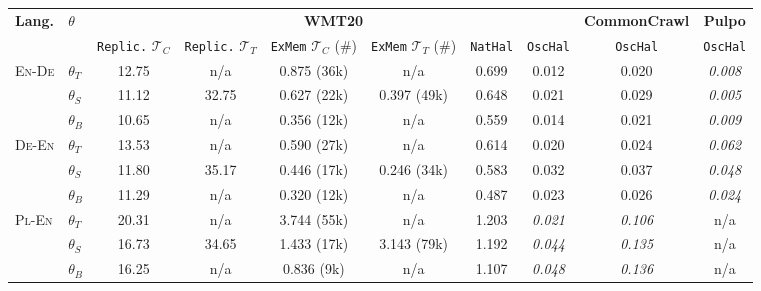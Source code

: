 \vspace{.1cm}
\noindent\begin{minipage}{\textwidth}
    \begin{center}
    {\centering\small\setlength{\tabcolsep}{4.5pt}
    \begin{tabular}{llcccccccc}
    \toprule
    \textbf{Lang.} & \textbf{$\theta$} & \multicolumn{6}{c}{\textbf{WMT20}} & \textbf{CommonCrawl} & \textbf{Pulpo} \\
    && \texttt{Replic.} $\mathcal{T}_C$ & \texttt{Replic.} $\mathcal{T}_T$ & \texttt{ExMem} $\mathcal{T}_C$ (\#) & \texttt{ExMem} $\mathcal{T}_T$ (\#) & \texttt{NatHal} & \texttt{OscHal} 
 & \texttt{OscHal} & \texttt{OscHal}\\ \midrule\midrule 
    \multirow{3}{*}{\textsc{En}-\textsc{De}}  & $\theta_T$          & 12.75 &  n/a    &  0.875 (36k) &  n/a         & 0.699 & 0.012         & 0.020          & \textit{0.008}  \\
                                              & $\theta_{S}$        & 11.12 &  32.75  &  0.627 (22k) &  0.397 (49k) & 0.648 & 0.021         & 0.029          & \textit{0.005}  \\
                                              & $\theta_{B}$        & 10.65 &  n/a    &  0.356 (12k) &  n/a         & 0.559 & 0.014         & 0.021          & \textit{0.009}  \\\midrule
    \multirow{3}{*}{\textsc{De}-\textsc{En}}  & $\theta_T$          & 13.53 &  n/a    &  0.590 (27k) &  n/a         & 0.614 & 0.020         & 0.024          & \textit{0.062}  \\
                                              & $\theta_{S}$        & 11.80 &  35.17  &  0.446 (17k) &  0.246 (34k) & 0.583 & 0.032         & 0.037          & \textit{0.048}  \\
                                              & $\theta_{B}$        & 11.29 &  n/a    &  0.320 (12k) &  n/a         & 0.487 & 0.023         & 0.026          & \textit{0.024}  \\\midrule
    \multirow{3}{*}{\textsc{Pl}-\textsc{En}}  & $\theta_T$          & 20.31 &  n/a    &  3.744 (55k) &  n/a         & 1.203 & \textit{0.021}& \textit{0.106} & n/a    \\
                                              & $\theta_{S}$        & 16.73 &  34.65  &  1.433 (17k) &  3.143 (79k) & 1.192 & \textit{0.044}& \textit{0.135} & n/a    \\
                                              & $\theta_{B}$        & 16.25 &  n/a    &  0.836 (9k)  &  n/a         & 1.107 & \textit{0.048}& \textit{0.136} & n/a    \\\midrule

\end{tabular}}
\end{center}
\end{minipage}
